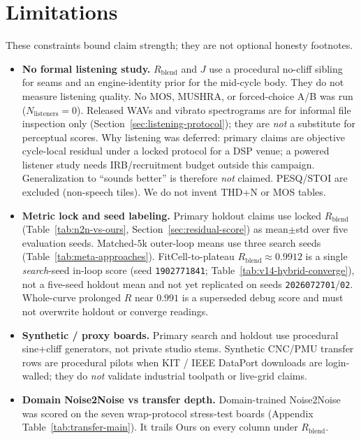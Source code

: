 \section{Limitations}
\label{sec:limitations}

These constraints bound claim strength; they are not optional honesty footnotes.

\begin{itemize}
  \item \textbf{No formal listening study.}
    $R_{\mathrm{blend}}$ and $J$ use a procedural no-cliff sibling for seams and an engine-identity prior for the mid-cycle body.
    They do not measure listening quality.
    No MOS, MUSHRA, or forced-choice A/B was run ($N_{\mathrm{listeners}}{=}0$).
    Released WAVs and vibrato spectrograms are for informal file inspection only
    (Section~\ref{sec:listening-protocol}); they are \emph{not} a substitute for perceptual scores.
    Why listening was deferred: primary claims are objective cycle-local residual under a locked protocol for a DSP venue;
    a powered listener study needs IRB/recruitment budget outside this campaign.
    Generalization to ``sounds better'' is therefore \emph{not} claimed.
    PESQ/STOI are excluded (non-speech tiles). We do not invent THD+N or MOS tables.
  \item \textbf{Metric lock and seed labeling.}
    Primary holdout claims use locked $R_{\mathrm{blend}}$ (Table~\ref{tab:n2n-vs-ours}, Section~\ref{sec:residual-score}) as mean$\pm$std over five evaluation seeds.
    Matched-$5$k outer-loop means use three search seeds (Table~\ref{tab:meta-approaches}).
    FitCell-to-plateau $R_{\mathrm{blend}}{\approx}0.9912$ is a single \emph{search}-seed in-loop score (seed \texttt{1902771841}; Table~\ref{tab:v14-hybrid-converge}), not a five-seed holdout mean and not yet replicated on seeds \texttt{2026072701}/\texttt{02}.
    Whole-curve prolonged $R$ near $0.991$ is a superseded debug score and must not overwrite holdout or converge readings.
  \item \textbf{Synthetic / proxy boards.}
    Primary search and holdout use procedural sine{+}cliff generators, not private studio stems.
    Synthetic CNC/PMU transfer rows are procedural pilots when KIT / IEEE DataPort downloads are login-walled;
    they do \emph{not} validate industrial toolpath or live-grid claims.
  \item \textbf{Domain Noise2Noise vs transfer depth.}
    Domain-trained Noise2Noise was scored on the seven wrap-protocol stress-test boards
    (Appendix Table~\ref{tab:transfer-main}). It trails Ours on every column under $R_{\mathrm{blend}}$.

\end{itemize}
